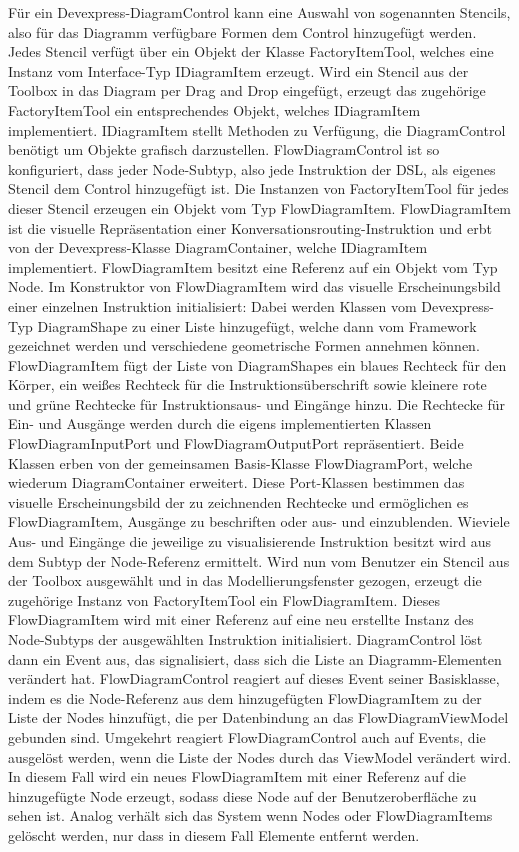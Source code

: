 Für ein Devexpress-DiagramControl kann eine Auswahl von sogenannten Stencils, also für das Diagramm verfügbare Formen dem Control hinzugefügt werden. Jedes Stencil verfügt über ein Objekt der Klasse FactoryItemTool, welches eine Instanz vom Interface-Typ IDiagramItem erzeugt. Wird ein Stencil aus der Toolbox in das Diagram per Drag and Drop eingefügt, erzeugt das zugehörige FactoryItemTool ein entsprechendes Objekt, welches IDiagramItem implementiert. IDiagramItem stellt Methoden zu Verfügung, die DiagramControl benötigt um Objekte grafisch darzustellen. FlowDiagramControl ist so konfiguriert, dass jeder Node-Subtyp, also jede Instruktion der DSL, als eigenes Stencil dem Control hinzugefügt ist. Die Instanzen von FactoryItemTool für jedes dieser Stencil erzeugen ein Objekt vom Typ FlowDiagramItem. FlowDiagramItem ist die visuelle Repräsentation einer Konversationsrouting-Instruktion und erbt von der Devexpress-Klasse DiagramContainer, welche IDiagramItem implementiert. FlowDiagramItem besitzt eine Referenz auf ein Objekt vom Typ Node. Im Konstruktor von FlowDiagramItem wird das visuelle Erscheinungsbild einer einzelnen Instruktion initialisiert: Dabei werden Klassen vom Devexpress-Typ DiagramShape zu einer Liste hinzugefügt, welche dann vom Framework gezeichnet werden und verschiedene geometrische Formen annehmen können. FlowDiagramItem fügt der Liste von DiagramShapes ein blaues Rechteck für den Körper, ein weißes Rechteck für die Instruktionsüberschrift sowie kleinere rote und grüne Rechtecke für Instruktionsaus- und Eingänge hinzu. Die Rechtecke für Ein- und Ausgänge werden durch die eigens implementierten Klassen FlowDiagramInputPort und FlowDiagramOutputPort repräsentiert. Beide Klassen erben von der gemeinsamen Basis-Klasse FlowDiagramPort, welche wiederum DiagramContainer erweitert. Diese Port-Klassen bestimmen das visuelle Erscheinungsbild der zu zeichnenden Rechtecke und ermöglichen es FlowDiagramItem, Ausgänge zu beschriften oder aus- und einzublenden. Wieviele Aus- und Eingänge die jeweilige zu visualisierende Instruktion besitzt wird aus dem Subtyp der Node-Referenz ermittelt.
\newline
Wird nun vom Benutzer ein Stencil aus der Toolbox ausgewählt und in das Modellierungsfenster gezogen, erzeugt die zugehörige Instanz von FactoryItemTool ein FlowDiagramItem. Dieses FlowDiagramItem wird mit einer Referenz auf eine neu erstellte Instanz des Node-Subtyps der ausgewählten Instruktion initialisiert. DiagramControl löst dann ein Event aus, das signalisiert, dass sich die Liste an Diagramm-Elementen verändert hat. FlowDiagramControl reagiert auf dieses Event seiner Basisklasse, indem es die Node-Referenz aus dem hinzugefügten FlowDiagramItem zu der Liste der Nodes hinzufügt, die per Datenbindung an das FlowDiagramViewModel gebunden sind. Umgekehrt reagiert FlowDiagramControl auch auf Events, die ausgelöst werden, wenn die Liste der Nodes durch das ViewModel verändert wird. In diesem Fall wird ein neues FlowDiagramItem mit einer Referenz auf die hinzugefügte Node erzeugt, sodass diese Node auf der Benutzeroberfläche zu sehen ist. Analog verhält sich das System wenn Nodes oder FlowDiagramItems gelöscht werden, nur dass in diesem Fall Elemente entfernt werden.
